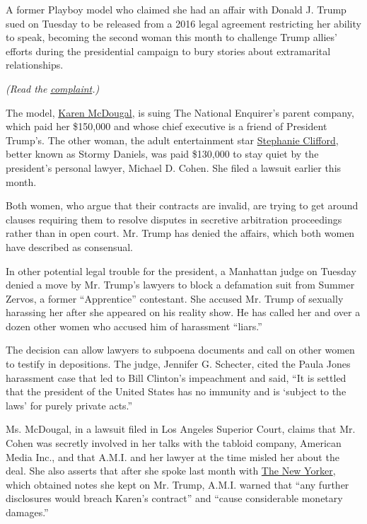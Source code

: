 A former Playboy model who claimed she had an affair with Donald J.
Trump sued on Tuesday to be released from a 2016 legal agreement
restricting her ability to speak, becoming the second woman this month
to challenge Trump allies' efforts during the presidential campaign to
bury stories about extramarital relationships.

\emph{(Read the}
\href{https://static01.graylady3jvrrxbe.onion/files/2018/us/mcdougal-complaint-exhibits.pdf?action=click\&module=Intentional\&pgtype=Article}{\emph{complaint}}\emph{.)}

The model,
\href{https://www.nytimes3xbfgragh.onion/2019/12/05/us/fox-news-mcdougal.html}{Karen
McDougal}, is suing The National Enquirer's parent company, which paid
her \$150,000 and whose chief executive is a friend of President
Trump's. The other woman, the adult entertainment star
\href{https://www.nytimes3xbfgragh.onion/2018/01/12/us/trump-stephanie-clifford-stormy-daniels.html}{Stephanie
Clifford}, better known as Stormy Daniels, was paid \$130,000 to stay
quiet by the president's personal lawyer, Michael D. Cohen. She filed a
lawsuit earlier this month.

Both women, who argue that their contracts are invalid, are trying to
get around clauses requiring them to resolve disputes in secretive
arbitration proceedings rather than in open court. Mr. Trump has denied
the affairs, which both women have described as consensual.

In other potential legal trouble for the president, a Manhattan judge on
Tuesday denied a move by Mr. Trump's lawyers to block a defamation suit
from Summer Zervos, a former ``Apprentice'' contestant. She accused Mr.
Trump of sexually harassing her after she appeared on his reality show.
He has called her and over a dozen other women who accused him of
harassment ``liars.''

The decision can allow lawyers to subpoena documents and call on other
women to testify in depositions. The judge, Jennifer G. Schecter, cited
the Paula Jones harassment case that led to Bill Clinton's impeachment
and said, ``It is settled that the president of the United States has no
immunity and is `subject to the laws' for purely private acts.''

Ms. McDougal, in a lawsuit filed in Los Angeles Superior Court, claims
that Mr. Cohen was secretly involved in her talks with the tabloid
company, American Media Inc., and that A.M.I. and her lawyer at the time
misled her about the deal. She also asserts that after she spoke last
month with
\href{https://www.newyorker.com/news/news-desk/donald-trump-a-playboy-model-and-a-system-for-concealing-infidelity-national-enquirer-karen-mcdougal}{The
New Yorker}, which obtained notes she kept on Mr. Trump, A.M.I. warned
that ``any further disclosures would breach Karen's contract'' and
``cause considerable monetary damages.''


